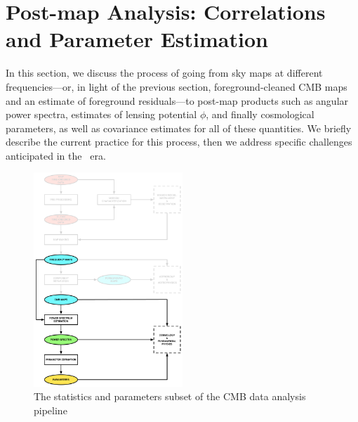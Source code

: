 \section{Post-map Analysis: Correlations and Parameter Estimation}

In this section, we discuss the process of going from sky maps at different frequencies---or, in light
of the previous section, foreground-cleaned CMB maps and an estimate of foreground residuals---to
post-map products such as angular power spectra, estimates of lensing potential $\phi$, and finally
cosmological parameters, as well as covariance estimates for all of these quantities. We briefly describe
the current practice for this process, then we address specific challenges anticipated in the \cmbexp\ era.
%
%
%
%
%
%
%
%

\begin{figure}[htbp]
\centering
\includegraphics[width=0.5\textwidth]{Analysis/sp}
\caption{The statistics and parameters subset of the CMB data analysis pipeline}
\label{fig_sp}
\end{figure}


